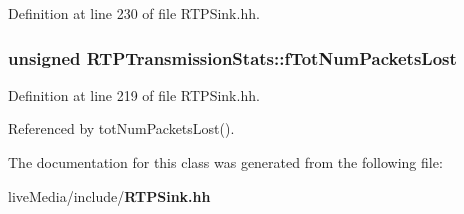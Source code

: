 Definition at line 230 of file R\+T\+P\+Sink.\+hh.

\subsubsection[{f\+Tot\+Num\+Packets\+Lost}]{\setlength{\rightskip}{0pt plus 5cm}unsigned R\+T\+P\+Transmission\+Stats\+::f\+Tot\+Num\+Packets\+Lost\hspace{0.3cm}{\ttfamily [private]}}\label{classRTPTransmissionStats_af52144db41fe17a04ab27a3bf7968800}


Definition at line 219 of file R\+T\+P\+Sink.\+hh.



Referenced by tot\+Num\+Packets\+Lost().



The documentation for this class was generated from the following file\+:\begin{DoxyCompactItemize}
\item 
live\+Media/include/{\bf R\+T\+P\+Sink.\+hh}\end{DoxyCompactItemize}
